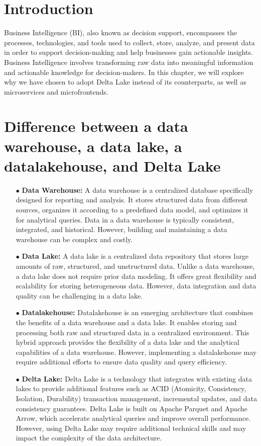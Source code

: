 
\section*{Introduction}

Business Intelligence (BI), also known as decision support, encompasses the processes, technologies, and tools used to collect, store, analyze, and present data in order to support decision-making and help businesses gain actionable insights. Business Intelligence involves transforming raw data into meaningful information and actionable knowledge for decision-makers. In this chapter, we will explore why we have chosen to adopt Delta Lake instead of its counterparts, as well as microservices and microfrontends.

\section{Difference between a data warehouse, a data lake, a datalakehouse, and Delta Lake}
\begin{enumerate}
\item[$\bullet$] \textbf{Data Warehouse:} A data warehouse is a centralized database specifically designed for reporting and analysis. It stores structured data from different sources, organizes it according to a predefined data model, and optimizes it for analytical queries. Data in a data warehouse is typically consistent, integrated, and historical. However, building and maintaining a data warehouse can be complex and costly.
\item[$\bullet$] \textbf{Data Lake:} A data lake is a centralized data repository that stores large amounts of raw, structured, and unstructured data. Unlike a data warehouse, a data lake does not require prior data modeling. It offers great flexibility and scalability for storing heterogeneous data. However, data integration and data quality can be challenging in a data lake.
\item[$\bullet$] \textbf{Datalakehouse:} Datalakehouse is an emerging architecture that combines the benefits of a data warehouse and a data lake. It enables storing and processing both raw and structured data in a centralized environment. This hybrid approach provides the flexibility of a data lake and the analytical capabilities of a data warehouse. However, implementing a datalakehouse may require additional efforts to ensure data quality and query efficiency.
\item[$\bullet$] \textbf{Delta Lake:} Delta Lake is a technology that integrates with existing data lakes to provide additional features such as ACID (Atomicity, Consistency, Isolation, Durability) transaction management, incremental updates, and data consistency guarantees. Delta Lake is built on Apache Parquet and Apache Arrow, which accelerate analytical queries and improve overall performance. However, using Delta Lake may require additional technical skills and may impact the complexity of the data architecture.
\end{enumerate}

